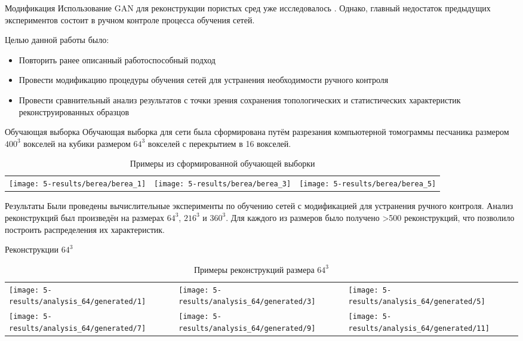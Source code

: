 \documentclass[12pt]{beamer}
\begin{document}
	\begin{frame}{Модификация}
		Использование GAN для реконструкции пористых сред уже исследовалось . Однако, главный недостаток предыдущих экспериментов состоит в ручном контроле процесса обучения сетей. 
		
		Целью данной работы было:
		\begin{itemize}
			\item Повторить ранее описанный работоспособный подход
			\item Провести модификацию процедуры обучения сетей для устранения необходимости ручного контроля
			\item Провести сравнительный анализ результатов с точки зрения сохранения топологических и статистических характеристик реконструированных образцов
		\end{itemize}
	\end{frame}

	\begin{frame}{Обучающая выборка}
		Обучающая выборка для сети была сформирована путём разрезания компьютерной томограммы песчаника размером $400^3$ вокселей на кубики размером $64^3$ вокселей с перекрытием в 16 вокселей.
		\begin{table}
			\centering
			\begin{tabular}{p{3cm} p{3cm} p{3cm}}
				\texttt{[image: 5-results/berea/berea\_1]}
				&
				\texttt{[image: 5-results/berea/berea\_3]}
				&
				\texttt{[image: 5-results/berea/berea\_5]}
			\end{tabular}
			\caption{Примеры из сформированной обучающей выборки}
		\end{table}
	\end{frame}

	\begin{frame}{Результаты}
		Были проведены вычислительные эксперименты по обучению сетей с модификацией для устранения ручного контроля. Анализ реконструкций был произведён на размерах $64^3$, $216^3$ и $360^3$. Для каждого из размеров было получено >500 реконструкций, что позволило построить распределения их характеристик.
	\end{frame}
	
	\begin{frame}{Реконструкции $64^3$}
		\begin{table}
			\centering
			\begin{tabular}{p{3cm} p{3cm} p{3cm}}
				\texttt{[image: 5-results/analysis\_64/generated/1]}
				&
				\texttt{[image: 5-results/analysis\_64/generated/3]}
				&
				\texttt{[image: 5-results/analysis\_64/generated/5]}
				\\
				\texttt{[image: 5-results/analysis\_64/generated/7]}
				&
				\texttt{[image: 5-results/analysis\_64/generated/9]}
				&
				\texttt{[image: 5-results/analysis\_64/generated/11]}
			\end{tabular}
			\caption{Примеры реконструкций размера $64^3$}
		\end{table}
	\end{frame}
	
\end{document}
